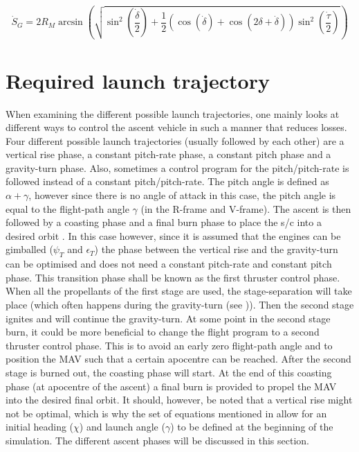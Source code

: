 \begin{equation} \label{eq:ground_dist}
\dot{S}_{G}=2R_{M}\arcsin\left(\sqrt{\sin^{2}\left(\dfrac{\dot{\delta}}{2}\right)+\frac{1}{2}\left(\cos\left(\dot{\delta}\right)+\cos\left(2\delta+\dot{\delta}\right)\right)\sin^{2}\left(\dfrac{\dot{\tau}}{2}\right)}\right)
\end{equation}



\section{Required launch trajectory}
\label{sec:reqlaunchtraj}
When examining the different possible launch trajectories, one mainly looks at different ways to control the ascent vehicle in such a manner that reduces losses. Four different possible launch trajectories (usually followed by each other) are a vertical rise phase, a constant pitch-rate phase, a constant pitch phase and a gravity-turn phase. Also, sometimes a control program for the pitch/pitch-rate is followed instead of a constant pitch/pitch-rate. The pitch angle is defined as $\alpha+\gamma$, however since there is no angle of attack in this case, the pitch angle is equal to the flight-path angle $\gamma$ (in the R-frame and V-frame). The ascent is then followed by a coasting phase and a final burn phase to place the \ac{s/c} into a desired orbit \cite{di2007system,fanning1996model,wittenberg2014rocket,pagano2010thesis}. In this case however, since it is assumed that the engines can be gimballed ($\psi_{T}$ and $\epsilon_{T}$) the phase between the vertical rise and the gravity-turn can be optimised and does not need a constant pitch-rate and constant pitch phase. This transition phase shall be known as the first thruster control phase. When all the propellants of the first stage are used, the stage-separation will take place (which often happens during the gravity-turn (see )). Then the second stage ignites and will continue the gravity-turn. At some point in the second stage burn, it could be more beneficial to change the flight program to a second thruster control phase. This is to avoid an early zero flight-path angle and to position the \ac{MAV} such that a certain apocentre can be reached. After the second stage is burned out, the coasting phase will start. At the end of this coasting phase (at apocentre of the ascent) a final burn is provided to propel the \ac{MAV} into the desired final orbit. It should, however, be noted that a vertical rise might not be optimal, which is why the set of equations mentioned in  allow for an initial heading ($\chi$) and launch angle ($\gamma$) to be defined at the beginning of the simulation. The different ascent phases will be discussed in this section.

